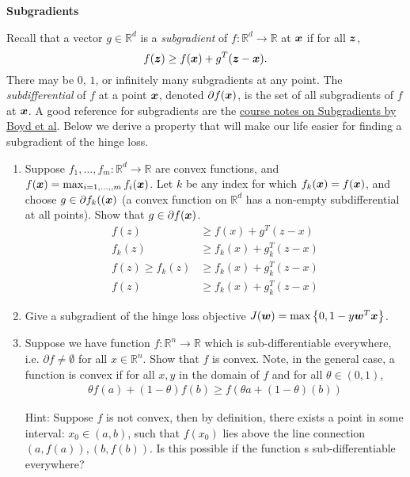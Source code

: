 \documentclass{article}
\newcommand{\nyuparagrah}[1]{\textcolor{nyupurple}{\large #1}}
\theoremstyle{plain}
\theoremstyle{definition}
\begin{document}
\nyuparagrah{\bf Subgradients} 

Recall that a vector $g\in\mathbb{R}^{d}$ is a \emph{subgradient} of
$f:\mathbb{R}^{d}\to\mathbb{R}$ at $\boldsymbol{x}$ if for all $\boldsymbol{z}$, 
\[
f(\boldsymbol{z})\ge f(\boldsymbol{x})+g^{T}(\boldsymbol{z}- \boldsymbol{x}).
\]
There may be $0$, $1$, or infinitely many
subgradients at any point. The \emph{subdifferential} of $f$ at
a point $\boldsymbol{x}$, denoted $\partial f(\boldsymbol{x})$, is the set of all subgradients
of $f$ at $\boldsymbol{x}$. 
  A good reference for subgradients are the \href{https://stanford.edu/class/ee364b/lectures/subgradients_notes.pdf}{course notes on Subgradients by Boyd et al}.
Below we derive a property
that will make our life easier for finding a subgradient of the hinge
loss.

\begin{enumerate}
  \setcounter{enumi}{\value{saveenum}}
\item Suppose $f_{1},\ldots,f_{m}:\mathbb{R}^{d}\to\mathbb{R}$
are convex functions, and 
$f(\boldsymbol{x})=\max_{i=1,\ldots,,m}f_{i}(\boldsymbol{x})$.
Let $k$ be any index for which $f_{k}(\boldsymbol{x})=f(\boldsymbol{x})$, and choose $g\in\partial f_{k}((\boldsymbol{x})$ (a convex function on $\mathbb{R}^{d}$ has
a non-empty subdifferential at all points). Show that $g\in\partial f(\boldsymbol{x})$.
\subitem 
\begin{equation}
\begin{split}
    f(z) &\geq f(x) + g^T(z-x) \\ 
    f_k(z) &\geq f_k(x) + g_k^T(z-x) \\
    f(z) \geq f_k(z) &\geq f_k(x) + g_k^T(z-x) \\
    f(z) &\geq  f_k(x) + g_k^T(z-x) 
\end{split}
\end{equation}

\item Give a subgradient of the hinge loss objective
$J(\boldsymbol{w})=\max\left\{ 0,1-y \boldsymbol{w}^{T} \boldsymbol{x}\right\}$.
 
\item Suppose we have function $f:\mathbb{R}^n\rightarrow\mathbb{R}$ which is sub-differentiable everywhere, i.e. $\partial f\neq \emptyset$ for all $x\in\mathbb{R}^n$. Show that $f$ is convex. Note, in the general case, a function is convex if for all $x,y$ in the domain of $f$ and for all $\theta \in (0,1)$,
\begin{align*}
    \theta f(a)+(1-\theta)f(b) \geq f(\theta a+(1-\theta)(b))
\end{align*}

Hint: Suppose $f$ is not convex, then by definition, there exists a point in some interval: $x_0\in (a,b)$, such that $f(x_0)$ lies above the line connection $(a,f(a)), (b,f(b))$. Is this possible if the function s sub-differentiable everywhere? 

\setcounter{saveenum}{\value{enumi}}
\end{enumerate}
\end{document}
